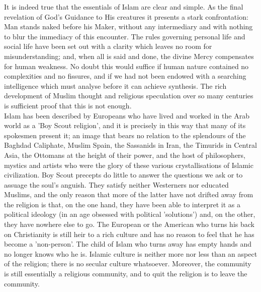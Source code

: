 \documentclass[10pt, twoside]{book}
\begin{document}
It is indeed true that the essentials of Islam are clear and simple. As the final revelation of God's Guidance to His creatures it presents a stark confrontation: Man stands naked before his Maker, without any intermediary and with nothing to blur the immediacy of this encounter. The rules governing personal life and social life have been set out with a clarity which leaves no room for misunderstanding; and, when all is said and done, the divine Mercy compensates for human weakness. No doubt this would suffice if human nature contained no complexities and no fissures, and if we had not been endowed with a searching intelligence which must analyse before it can achieve synthesis. The rich development of Muslim thought and religious speculation over so many centuries is sufficient proof that this is not enough. \\

Islam has been described by Europeans who have lived and worked in the Arab world as a 'Boy Scout religion', and it is precisely in this way that many of its spokesmen present it; an image that bears no relation to the splendours of the Baghdad Caliphate, Muslim Spain, the Sassanids in Iran, the Timurids in Central Asia, the Ottomans at the height of their power, and the host of philosophers, mystics and artists who were the glory of these various crystallisations of Islamic civilization. Boy Scout precepts do little to answer the questions we ask or to assuage the soul's anguish. They satisfy neither Westerners nor educated Muslims, and the only reason that more of the latter have not drifted away from the religion is that, on the one hand, they have been able to interpret it as a political ideology (in an age obsessed with political 'solutions') and, on the other, they have nowhere else to go. The European or the American who turns his back on Christianity is still heir to a rich culture and has no reason to feel that he has become a 'non\hyp{}person'. The child of Islam who turns away has empty hands and no longer knows who he is. Islamic culture is neither more nor less than an aspect of the religion; there is no secular culture whatsoever. Moreover, the community is still essentially a religious community, and to quit the religion is to leave the community. \\
\end{document}
